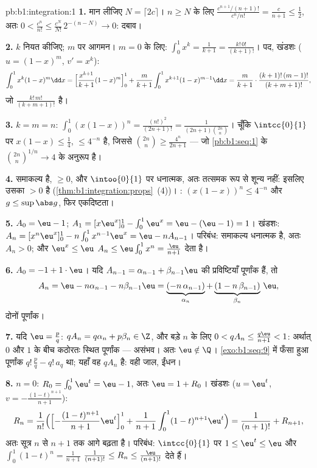 \begin{solution}{pb:b1:integration:1}
\textbf{1.} मान लीजिए $N = \lceil 2c \rceil$। $n \geq N$ के लिए
$\frac{c^{n+1}/(n+1)!}{c^n/n!} = \frac{c}{n+1} \leq \frac12$, अतः $0 <
\frac{c^n}{n!} \leq \frac{c^N}{N!}\,2^{-(n - N)} \to 0$: दबाव।

\textbf{2.} $k$ नियत कीजिए; $m$ पर आगमन। $m = 0$ के लिए: $\int_0^1 x^k =
\frac{1}{k+1} = \frac{k!\,0!}{(k+1)!}$। पद, खंडशः ($u = (1-x)^m$, $v' =
x^k$):
\[
\int_0^1 x^k (1-x)^m \dd x
= \Bigl[\frac{x^{k+1}}{k+1}(1-x)^m\Bigr]_0^1
+ \frac{m}{k+1}\int_0^1 x^{k+1}(1-x)^{m-1}\dd x
= \frac{m}{k+1}\cdot\frac{(k+1)!\,(m-1)!}{(k+m+1)!} ,
\]
जो $\frac{k!\,m!}{(k+m+1)!}$ है।

\textbf{3.} $k = m = n$: $\int_0^1 (x(1-x))^n = \frac{(n!)^2}{(2n+1)!} =
\frac{1}{(2n+1)\binom{2n}{n}}$। चूँकि $\intcc{0}{1}$ पर $x(1-x) \leq
\frac14$,  $\leq 4^{-n}$ है, जिससे $\binom{2n}{n} \geq
\frac{4^n}{2n+1}$ --- जो \cref{pb:b1:seq:1} के $\binom{2n}{n}^{1/n} \to 4$
के अनुरूप है।

\textbf{4.} समाकल्य  है, $\geq 0$, और $\intoo{0}{1}$ पर धनात्मक, अतः
तत्समक रूप से शून्य नहीं: इसलिए उसका  $> 0$ है
(\cref{thm:b1:integration:props}~(4))। : $(x(1-x))^n \leq 4^{-n}$
और $g \leq \sup\abs g$, फिर एकदिष्टता।

\textbf{5.} $A_0 = \eu - 1$; $A_1 = [x\eu^x]_0^1 - \int_0^1 \eu^x = \eu -
(\eu - 1) = 1$। खंडशः: $A_n = [x^n \eu^x]_0^1 - n\int_0^1 x^{n-1}\eu^x = \eu
- n A_{n-1}$। परिबंध: समाकल्य धनात्मक है, अतः $A_n > 0$; और $\eu^x \leq \eu$
$A_n \leq \eu\int_0^1 x^n = \frac{\eu}{n+1}$ देता है।

\textbf{6.} $A_0 = -1 + 1\cdot\eu$। यदि $A_{n-1} = \alpha_{n-1} +
\beta_{n-1}\eu$ की प्रविष्टियाँ पूर्णांक हैं, तो
\[
A_n = \eu - n\alpha_{n-1} - n\beta_{n-1}\eu
= \underbrace{(-n\,\alpha_{n-1})}_{\alpha_n}
+ \underbrace{(1 - n\,\beta_{n-1})}_{\beta_n}\,\eu ,
\]
दोनों पूर्णांक।

\textbf{7.} यदि $\eu = \frac pq$: $q A_n = q\alpha_n + p\beta_n \in \Z$, और
बड़े $n$ के लिए $0 < qA_n \leq \frac{q\eu}{n+1} < 1$: अर्थात् $0$ और $1$ के
बीच कठोरतः स्थित पूर्णांक --- असंभव। अतः $\eu \notin \Q$।
\cref{exo:b1:seq:9} में फँसा हुआ पूर्णांक $q!\,\frac pq - q!\,a_q$ था; यहाँ
वह $qA_n$ है: वही जाल,  ईंधन।

\textbf{8.} $n = 0$: $R_0 = \int_0^1 \eu^t = \eu - 1$, अतः $\eu = 1 + R_0$।
खंडशः ($u = \eu^t$, $v = -\frac{(1-t)^{n+1}}{n+1}$):
\[
R_n = \frac{1}{n!}\Bigl(\Bigl[-\frac{(1-t)^{n+1}}{n+1}
\eu^t\Bigr]_0^1 + \frac{1}{n+1}\int_0^1 (1-t)^{n+1}\eu^t\Bigr)
= \frac{1}{(n+1)!} + R_{n+1} ,
\]
अतः सूत्र $n$ से $n + 1$ तक आगे बढ़ता है। परिबंध: $\intcc{0}{1}$ पर $1 \leq
\eu^t \leq \eu$ और $\int_0^1 (1-t)^n = \frac{1}{n+1}$ $\frac{1}{(n+1)!} \leq
R_n \leq \frac{\eu}{(n+1)!}$ देते हैं।


\end{solution}
